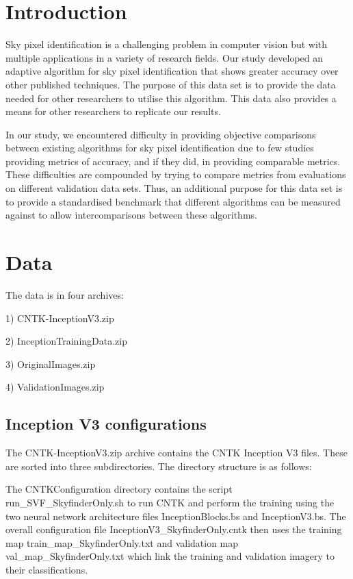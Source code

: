 \documentclass[final,3p,times,authoryear]{elsarticle}
\begin{document}
\section{Introduction}
\label{sec:introduction}
Sky pixel identification is a challenging problem in computer vision but with multiple applications in a variety of research fields. Our study \citep{Nice2019UC} developed an adaptive algorithm for sky pixel identification that shows greater accuracy over other published techniques. The purpose of this data set is to provide the data needed for other researchers to utilise this algorithm. This data also provides a means for other researchers to replicate our results.

In our study, we encountered difficulty in providing objective comparisons between existing algorithms for sky pixel identification due to few studies providing metrics of accuracy, and if they did, in providing comparable metrics. These difficulties are compounded by trying to compare metrics from evaluations on different validation data sets. Thus, an additional purpose for this data set is to provide a standardised benchmark that different algorithms can be measured against to allow intercomparisons between these algorithms.




\section{Data}

The data is in four archives: 

1) CNTK-InceptionV3.zip

2) InceptionTrainingData.zip

3) OriginalImages.zip

4) ValidationImages.zip

\subsection{Inception V3 configurations}\label{sec:configuations}
The CNTK-InceptionV3.zip archive contains the CNTK Inception V3 files. These are sorted into three subdirectories. The directory structure is as follows:


The CNTKConfiguration directory contains the script run\_SVF\_SkyfinderOnly.sh to run CNTK and perform the training using the two neural network architecture files InceptionBlocks.bs and InceptionV3.bs. The overall configuration file InceptionV3\_SkyfinderOnly.cntk then uses the training map train\_map\_SkyfinderOnly.txt and validation map val\_map\_SkyfinderOnly.txt which link the training and validation imagery to their classifications.
\end{document}
